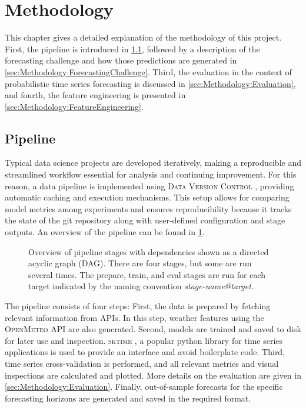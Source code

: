 \newpage
\section{Methodology}
\label{ch:Methodology}

This chapter gives a detailed explanation of the methodology of this project. First, the pipeline is introduced in \cref{sec:Methodology:Pipeline}, followed by a description of the forecasting challenge and how those predictions are generated in \cref{sec:Methodology:ForecastingChallenge}. Third, the evaluation in the context of probabilistic time series forecasting is discussed in \cref{sec:Methodology:Evaluation}, and fourth, the feature engineering is presented in \cref{sec:Methodology:FeatureEngineering}.

\subsection{Pipeline}
\label{sec:Methodology:Pipeline}

Typical data science projects are developed iteratively, making a reproducible and streamlined workflow essential for analysis and continuing improvement. For this reason, a data pipeline is implemented using \textsc{Data Version Control} \parencite{ruslan_kuprieiev_dvc_2024}, providing automatic caching and execution mechanisms. This setup allows for comparing model metrics among experiments and ensures reproducibility because it tracks the state of the git repository along with user-defined configuration and stage outputs. An overview of the pipeline can be found in \cref{fig:pipeline}.
\begin{figure}[htbp]
  \centering
  
  \caption{Overview of pipeline stages with dependencies shown as a directed acyclic graph (DAG). There are four stages, but some are run several times. The prepare, train, and eval stages are run for each target indicated by the naming convention \textit{stage-name@target}.} 
  \label{fig:pipeline}
\end{figure}
The pipeline consists of four steps: First, the data is prepared by fetching relevant information from APIs. In this step, weather features using the \textsc{OpenMeteo} API are also generated. Second, models are trained and saved to disk for later use and inspection. \textsc{sktime} \parencite{franz_kiraly_sktimesktime_2024}, a popular python library for time series applications is used to provide an interface and avoid boilerplate code. Third, time series cross-validation is performed, and all relevant metrics and visual inspections are calculated and plotted. More details on the evaluation are given in \cref{sec:Methodology:Evaluation}. Finally, out-of-sample forecasts for the specific forecasting horizons are generated and saved in the required format.

